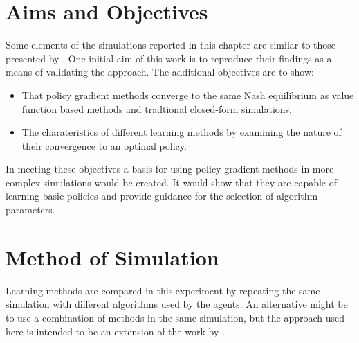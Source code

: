 \section{Aims and Objectives}
Some elements of the simulations reported in this chapter are similar to those
presented by .  One initial aim of this work is to
reproduce their findings as a means of validating the approach.  The additional
objectives are to show:
\begin{itemize}
  \item That policy gradient methods converge to the same Nash equilibrium as
  value function based methods and tradtional closed-form simulations,
  \item The charateristics of different learning methods by examining the
  nature of their convergence to an optimal policy.
\end{itemize}
In meeting these objectives a basis for using policy gradient methods in more
complex simulations would be created.  It would show that they are capable of
learning basic policies and provide guidance for the selection of algorithm
parameters.

\section{Method of Simulation}
Learning methods are compared in this experiment by repeating the same
simulation with different algorithms used by the agents.  An alternative
might be to use a combination of methods in the same simulation, but the
approach used here is intended to be an extension of the work by
.

